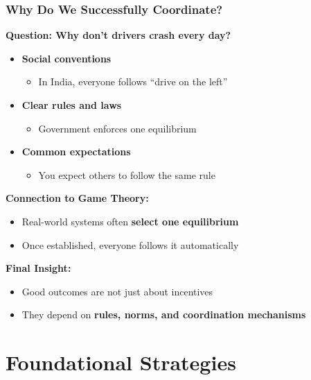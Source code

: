 \begin{frame}[fragile]\frametitle{Why Do We Successfully Coordinate?}

\textbf{Question: Why don’t drivers crash every day?}

\vspace{6pt}

\begin{itemize}
  \item \textbf{Social conventions}
  \begin{itemize}
    \item In India, everyone follows “drive on the left”
  \end{itemize}
  
  \item \textbf{Clear rules and laws}
  \begin{itemize}
    \item Government enforces one equilibrium
  \end{itemize}
  
  \item \textbf{Common expectations}
  \begin{itemize}
    \item You expect others to follow the same rule
  \end{itemize}
\end{itemize}

\vspace{8pt}

\textbf{Connection to Game Theory:}
\begin{itemize}
  \item Real-world systems often \textbf{select one equilibrium}
  \item Once established, everyone follows it automatically
\end{itemize}

\vspace{8pt}

\textbf{Final Insight:}
\begin{itemize}
  \item Good outcomes are not just about incentives
  \item They depend on \textbf{rules, norms, and coordination mechanisms}
\end{itemize}

\end{frame}


\section{Foundational Strategies}

